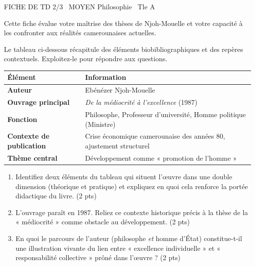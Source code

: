 \documentclass[11pt]{article}
\begin{document}
\begin{tcolorbox}[enhanced,colback=popink,colframe=popink,arc=10pt,boxrule=0pt,left=12pt,right=12pt,top=9pt,bottom=9pt]
{\color{white}\popxbold\small FICHE DE TD 2/3 \textbullet\ MOYEN \hfill Philosophie \textbullet\ Tle A\par}
\end{tcolorbox}
\vspace{4pt}
\noindent Cette fiche évalue votre maîtrise des thèses de Njoh-Mouelle et votre capacité à les confronter aux réalités camerounaises actuelles.

\begin{exercice}
\noindent Le tableau ci-dessous récapitule des éléments biobibliographiques et des repères contextuels. Exploitez-le pour répondre aux questions.

\begin{tabularx}{\linewidth}{>{\bfseries}l X}
\toprule
\textbf{Élément} & \textbf{Information} \\
\midrule
Auteur & Ebénézer Njoh-Mouelle \\
Ouvrage principal & \textit{De la médiocrité à l'excellence} (1987) \\
Fonction & Philosophe, Professeur d'université, Homme politique (Ministre) \\
Contexte de publication & Crise économique camerounaise des années 80, ajustement structurel \\
Thème central & Développement comme « promotion de l'homme » \\
\bottomrule
\end{tabularx}

\begin{enumerate}
\item Identifiez deux éléments du tableau qui situent l'œuvre dans une double dimension (théorique et pratique) et expliquez en quoi cela renforce la portée didactique du livre. (2 pts)
\item L'ouvrage paraît en 1987. Reliez ce contexte historique précis à la thèse de la « médiocrité » comme obstacle au développement. (2 pts)
\item En quoi le parcours de l'auteur (philosophe \textit{et} homme d'État) constitue-t-il une illustration vivante du lien entre « excellence individuelle » et « responsabilité collective » prôné dans l'œuvre ? (2 pts)
\end{enumerate}
\end{exercice}
\end{document}
